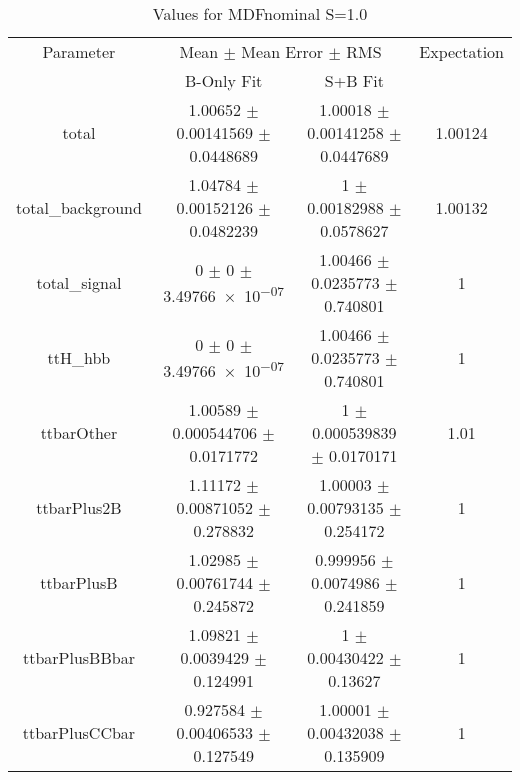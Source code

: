 \begin{table}
\centering
\caption{Values for MDFnominal S=1.0}
\begin{tabular}{cccc}
\toprule
Parameter & \multicolumn{2}{c}{Mean $\pm$ Mean Error $\pm$ RMS} & Expectation\\
 & B-Only Fit & S+B Fit & \\
\midrule
total & \num{1.00652} $\pm$ \num{0.00141569} $\pm$ \num{0.0448689} & \num{1.00018} $\pm$ \num{0.00141258} $\pm$ \num{0.0447689} & \num{1.00124}\\
total\_background & \num{1.04784} $\pm$ \num{0.00152126} $\pm$ \num{0.0482239} & \num{1} $\pm$ \num{0.00182988} $\pm$ \num{0.0578627} & \num{1.00132}\\
total\_signal & \num{0} $\pm$ \num{0} $\pm$ \num{3.49766e-07} & \num{1.00466} $\pm$ \num{0.0235773} $\pm$ \num{0.740801} & \num{1}\\
ttH\_hbb & \num{0} $\pm$ \num{0} $\pm$ \num{3.49766e-07} & \num{1.00466} $\pm$ \num{0.0235773} $\pm$ \num{0.740801} & \num{1}\\
ttbarOther & \num{1.00589} $\pm$ \num{0.000544706} $\pm$ \num{0.0171772} & \num{1} $\pm$ \num{0.000539839} $\pm$ \num{0.0170171} & \num{1.01}\\
ttbarPlus2B & \num{1.11172} $\pm$ \num{0.00871052} $\pm$ \num{0.278832} & \num{1.00003} $\pm$ \num{0.00793135} $\pm$ \num{0.254172} & \num{1}\\
ttbarPlusB & \num{1.02985} $\pm$ \num{0.00761744} $\pm$ \num{0.245872} & \num{0.999956} $\pm$ \num{0.0074986} $\pm$ \num{0.241859} & \num{1}\\
ttbarPlusBBbar & \num{1.09821} $\pm$ \num{0.0039429} $\pm$ \num{0.124991} & \num{1} $\pm$ \num{0.00430422} $\pm$ \num{0.13627} & \num{1}\\
ttbarPlusCCbar & \num{0.927584} $\pm$ \num{0.00406533} $\pm$ \num{0.127549} & \num{1.00001} $\pm$ \num{0.00432038} $\pm$ \num{0.135909} & \num{1}\\
\bottomrule
\end{tabular}
\end{table}